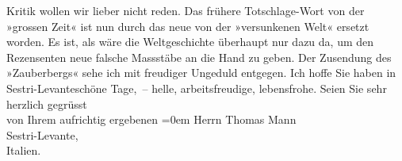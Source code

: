 \begin{ledgroupsized}[t]{13cm}
               Kritik wollen wir lieber nicht reden. Das frühere Totschlage-Wort von der »grossen
               Zeit« ist nun durch das neue von der »versunkenen Welt« ersetzt worden. Es ist, als
               wäre die Weltgeschichte überhaupt nur dazu da, um den Rezensenten neue falsche
               Massstäbe an die Hand zu geben.\pend
           \pstart
           Der Zusendung des »Zauberbergs« sehe ich mit
               freudiger Ungeduld entgegen. Ich hoffe Sie haben in Sestri-Levanteschöne Tage, – helle, arbeitsfreudige,
               lebensfrohe.\pend
           \pstart
           Seien Sie sehr herzlich gegrüsst{\\[\baselineskip]}von Ihrem aufrichtig ergebenen\pend
           \leftskip=0em{}\pstart
           \noindent{}Herrn Thomas Mann{\\}Sestri-Levante,{\\}Italien.\pend
                     \endnumbering{}\end{ledgroupsized}  \newcommand{\dateiname}{L02420}\newcommand{\titel}{Arthur Schnitzler an Thomas Mann, 6. 11. 1924}\newcommand{\editorInnen}{Martin Anton Müller und Gerd-Hermann Susen}
      